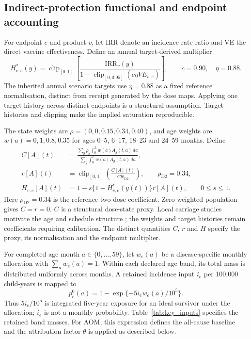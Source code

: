 \documentclass[10pt,letterpaper]{article}
\newcommand{\clip}{\operatorname{clip}}
\begin{document}
\subsection{Indirect-protection functional and endpoint accounting}
For endpoint $e$ and product $v$, let IRR denote an incidence rate ratio and VE the direct vaccine effectiveness. Define an annual target-derived multiplier
\begin{equation}
 H^*_{v,e}(y)=\clip_{[0,1]}\left[
 \frac{\mathrm{IRR}_v(y)}{1-\clip_{[0,0.95]}(c\eta VE_{v,e})}\right],
 \qquad c=0.90,\quad\eta=0.88.
 \label{eq:target}
\end{equation}
The inherited annual scenario targets use $\eta=0.88$ as a fixed reference normalisation, distinct from receipt generated by the dose maps. Applying one target history across distinct endpoints is a structural assumption. Target histories and clipping make the implied saturation reproducible.

The state weights are $\rho=(0,0,0.15,0.34,0.40)$, and age weights are $w(a)=0,1,0.8,0.35$ for ages 0--5, 6--17, 18--23 and 24--59 months. Define
\begin{align}
 C[A](t)&=\frac{\sum_g\rho_g\int_0^Lw(a)A_g(t,a)\,da}
                   {\sum_g\int_0^Lw(a)A_g(t,a)\,da},\label{eq:C}\\
 r[A](t)&=\clip_{[0,1]}\left(\frac{C[A](t)}{c\eta\rho_{\mathrm{D2}}}\right),\qquad\rho_{\mathrm{D2}}=0.34,\label{eq:r}\\
 H_{v,e}[A](t)&=1-s\{1-H^*_{v,e}(y(t))\}r[A](t),\qquad0\le s\le1.\label{eq:H}
\end{align}
Here $\rho_{\mathrm{D2}}=0.34$ is the reference two-dose coefficient. Zero weighted population gives $C=r=0$. $C$ is a structural dose-state proxy. Local carriage studies motivate the age and schedule structure \cite{SmithVaughan2023VietnamCarriage,Tao2026VietnamCarriageReview}; the weights and target histories remain coefficients requiring calibration. The distinct quantities $C$, $r$ and $H$ specify the proxy, its normalisation and the endpoint multiplier.

For completed age month $a\in\{0,\ldots,59\}$, let $w_e(a)$ be a disease-specific monthly allocation with $\sum_a w_e(a)=1$. Within each declared age band, its total mass is distributed uniformly across months. A retained incidence input $i_e$ per 100,000 child-years is mapped to
\begin{equation}
 p_e^0(a)=1-\exp\{-5i_e w_e(a)/10^5\}.
 \label{eq:baseline_age_probability}
\end{equation}
Thus $5i_e/10^5$ is integrated five-year exposure for an ideal survivor under the allocation; $i_e$ is not a monthly probability. Table~\ref{tab:key_inputs} specifies the retained band masses. For AOM, this expression defines the all-cause baseline and the attribution factor $\theta$ is applied as described below.
\end{document}

